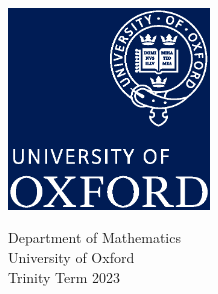 \documentclass[../dissertation.tex]{subfiles}
\begin{document}
\begin{titlepage}
    \begin{center}
        \vspace*{1cm}

        \Huge
        \textbf{\titlename}

        \vspace{0.5cm}

        \vspace{1.5cm}


        \vfill



        \includegraphics[width=0.4\textwidth]{oxfordlogo}

        \vspace{0.34\textheight}

        \large
        Department of Mathematics\\
        University of Oxford\\
        Trinity Term 2023

    \end{center}
\end{titlepage}
\end{document}
